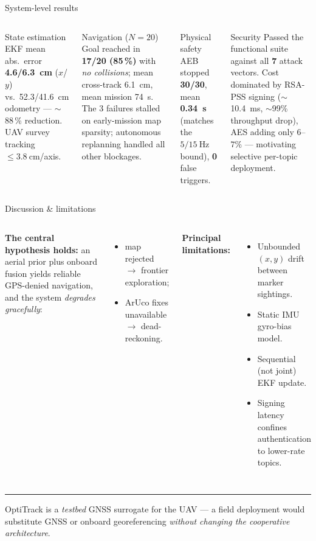 \documentclass[aspectratio=169,11pt]{beamer}
\begin{document}
\begin{frame}{System-level results}
\small
\begin{columns}[T]
\begin{block}{State estimation}
EKF mean abs.\ error \textbf{\SI{4.6}{}/\SI{6.3}{\centi\meter}} ($x$/$y$) vs.\
\SI{52.3}{}/\SI{41.6}{\centi\meter} odometry --- \alert{$\sim$88\,\% reduction}.
UAV survey tracking $\le\SI{3.8}{\centi\meter}$/axis.
\end{block}
\begin{block}{Navigation ($N=20$)}
Goal reached in \textbf{17/20 (85\,\%)} with \emph{no collisions}; mean cross-track
\SI{6.1}{\centi\meter}, mean mission \SI{74}{\second}. The 3 failures stalled on
early-mission map sparsity; autonomous replanning handled all other blockages.
\end{block}
\begin{block}{Physical safety}
AEB stopped \textbf{30/30}, mean \textbf{\SI{0.34}{\second}} (matches the
$5/\SI{15}{\hertz}$ bound), \textbf{0} false triggers.
\end{block}
\begin{block}{Security}
Passed the functional suite against all \textbf{7} attack vectors. Cost dominated
by RSA-PSS signing ($\sim$\SI{10.4}{\milli\second}, $\sim$99\% throughput drop),
AES adding only $6$--$7\%$ --- motivating selective per-topic deployment.
\end{block}
\end{columns}
\end{frame}

\begin{frame}{Discussion \& limitations}
\begin{columns}[T]
\footnotesize
\textbf{The central hypothesis holds:} an aerial prior plus onboard fusion yields
reliable GPS-denied navigation, and the system \emph{degrades gracefully}:
\begin{itemize}\footnotesize
  \item map rejected $\to$ frontier exploration;
  \item ArUco fixes unavailable $\to$ dead-reckoning.
\end{itemize}
\footnotesize
\textbf{Principal limitations:}
\begin{itemize}\footnotesize
  \item Unbounded $(x,y)$ drift between marker sightings.
  \item Static IMU gyro-bias model.
  \item Sequential (not joint) EKF update.
  \item Signing latency confines authentication to lower-rate topics.
\end{itemize}
\end{columns}
\vspace{0.6em}
{\color{mAccent}\rule{\textwidth}{0.6pt}}
\vspace{0.3em}

\footnotesize OptiTrack is a \emph{testbed} GNSS surrogate for the UAV --- a field
deployment would substitute GNSS or onboard georeferencing \emph{without changing
the cooperative architecture}.
\end{frame}
\end{document}
